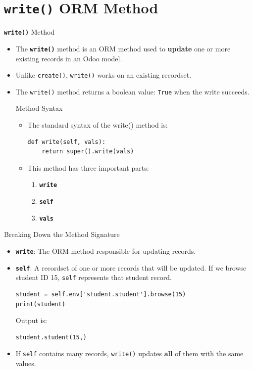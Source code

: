 
\section{\textbf{\texttt{write()}} ORM Method}

\begin{frame}[fragile]{\textbf{\texttt{write()}} Method}
	\begin{itemize}
		\item The \textbf{\texttt{write()}} method is an ORM method used to \textbf{update} one or more existing records in an Odoo model.
		\item Unlike \texttt{create()}, \texttt{write()} works on an existing recordset.
		\item The \texttt{write()} method returns a boolean value: \texttt{True} when the write succeeds.
\begin{block}{Method Syntax}
	\begin{itemize}
		\item The standard syntax of the write() method is:
\begin{lstlisting}
def write(self, vals):
	return super().write(vals)
\end{lstlisting}
		\item This method has three important parts:
		\begin{enumerate}
			\item \textbf{\texttt{write}}
			\item \textbf{\texttt{self}}
			\item \textbf{\texttt{vals}}
		\end{enumerate}
	\end{itemize}
\end{block}
	\end{itemize}
\end{frame}

\begin{frame}[fragile]{Breaking Down the Method Signature}
	\begin{block}{}
		\begin{itemize}
			\item \textbf{\texttt{write}}: The ORM method responsible for updating records.
			\item \textbf{\texttt{self}}: A recordset of one or more records that will be updated.
			      If we browse student ID 15, \texttt{self} represents that student record.
\begin{lstlisting}
student = self.env['student.student'].browse(15)
print(student)
\end{lstlisting}
			Output is:
\begin{lstlisting}
student.student(15,)
\end{lstlisting}
			\item If \texttt{self} contains many records, \texttt{write()} updates \textbf{all} of them with the same values.
		\end{itemize}
	\end{block}
\end{frame}

